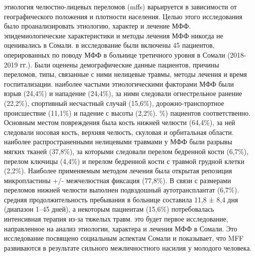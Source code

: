 этиология челюстно-лицевых переломов (mffs) варьируется в зависимости от
географического положения и плотности населения. Целью этого исследования было
проанализировать этиологию, характер и лечение МФФ. эпидемиологические
характеристики и методы лечения МФФ никогда не оценивались в Сомали. в
исследование были включены 45 пациентов, оперированных по поводу МФФ в больнице
третичного уровня в Сомали (2018-2019 гг.). Были оценены демографические данные
пациентов, причины переломов, типы, связанные с ними нелицевые травмы, методы
лечения и время госпитализации. наиболее частыми этиологическими факторами МФФ
были взрыв (24,4\%) и нападение (24,4\%), за ними следовали огнестрельное
ранение (22,2\%), спортивный несчастный случай (15,6\%), дорожно-транспортное
происшествие (11,1\%) и падение с высоты (2,2\%). \%) пациентов соответственно.
Основным местом повреждения была кость нижней челюсти (64,4\%), за ней следовали
носовая кость, верхняя челюсть, скуловая и орбитальная области. наиболее
распространенными нелицевыми травмами у МФФ были разрывы мягких тканей (37,8\%),
за которыми следовали перелом бедренной кости (6,7\%), перелом ключицы (4,4\%) и
перелом бедренной кости с травмой грудной клетки (2,2\%). Наиболее применяемым
методом лечения была открытая репозиция микропластины +/- межчелюстная фиксация
(77,8\%). В связи с размерами переломов нижней челюсти выполнен подвздошный
аутотрансплантат (6,7\%). средняя продолжительность пребывания в больнице
составила 11,8 ± 8,4 дня (диапазон 1–45 дней), а некоторым пациентам (15,6\%)
потребовалась интенсивная терапия из-за тяжелых травм. это будет первое
исследование, направленное на анализ этиологии, характера и лечения МФФ в
Сомали. Это исследование посвящено социальным аспектам Сомали и показывает, что
MFF развиваются в результате сильного межличностного насилия у молодого
человека.\cite{tekin2021}

